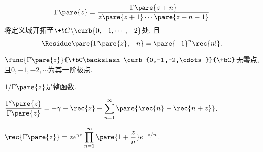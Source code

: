 \documentclass{ctexart}
\begin{document}
\[ \Gamma\pare{z} = \frac{\Gamma\pare{z+n}}{z\pare{z+1}\cdots \pare{z+n-1}} \]
将定义域开拓至$\+bC\backslash \curb{0,-1,\cdots, -2}$处. 且
\[ \Residue\pare{\Gamma\pare{z}, -n} = \pare{-1}^n \rec{n!}. \]
\begin{theorem}
    $\func{\Gamma\pare{z}}{\+bC\backslash\curb{0,-1,-2,\cdots}}{\+bC}$无零点, 且$0,-1,-2,\cdots$为其一阶极点.
\end{theorem}
\begin{theorem}
    $1/\Gamma\pare{z}$是整函数.
\end{theorem}
\begin{theorem}
    $\displaystyle \frac{\Gamma'\pare{z}}{\Gamma\pare{z}} = - \gamma - \rec{z} + \sum_{n=1}^\infty \pare{\rec{n} - \rec{n+z}}$.
\end{theorem}
\begin{theorem}
    $\displaystyle \rec{\Gamma\pare{z}} = ze^{\gamma z} \displaystyle \prod_{n=1}^\infty \pare{1+\frac{z}{n}}e^{-z/n}$.
\end{theorem}


\end{document}
